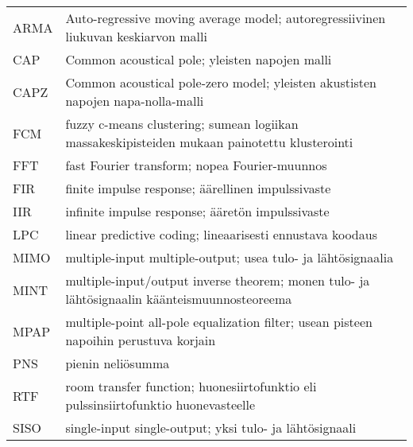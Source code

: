 \documentclass[finnish,12pt]{article}
\begin{document}
\begin{tabular}{p{2cm}p{12cm}}
ARMA					& Auto-regressive moving average model; autoregressiivinen liukuvan keskiarvon malli \\
CAP						& Common acoustical pole; yleisten napojen malli \\
CAPZ					& Common acoustical pole-zero model; yleisten akustisten napojen napa-nolla-malli \\
FCM						& fuzzy c-means clustering; sumean logiikan massakeskipisteiden mukaan painotettu klusterointi \\
FFT						& fast Fourier transform; nopea Fourier-muunnos \\
FIR						& finite impulse response; äärellinen impulssivaste \\
IIR						& infinite impulse response; ääretön impulssivaste \\
LPC						& linear predictive coding; lineaarisesti ennustava koodaus \\
MIMO					& multiple-input multiple-output; usea tulo- ja lähtösignaalia \\
MINT					& multiple-input/output inverse theorem; monen tulo- ja lähtösignaalin käänteismuunnosteoreema \\
MPAP					& multiple-point all-pole equalization filter; usean pisteen napoihin perustuva korjain \\
PNS						& pienin neliösumma \\
RTF						& room transfer function; huonesiirtofunktio eli pulssinsiirtofunktio huonevasteelle \\
SISO					& single-input single-output; yksi tulo- ja lähtösignaali \\

\end{tabular}

\cleardoublepage
\storeinipagenumber
{}
\setcounter{page}{1}


\end{document}
